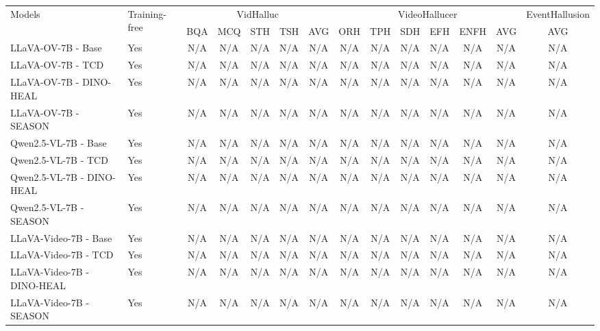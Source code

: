 \begin{tabular}{llccccc|cccccc|c}
\toprule
\multirow{2}{*}{Models} & \multirow{2}{*}{Training-free} & \multicolumn{5}{c|}{VidHalluc} & \multicolumn{6}{c|}{VideoHallucer} & EventHallusion \\
 & & BQA & MCQ & STH & TSH & AVG & ORH & TPH & SDH & EFH & ENFH & AVG & AVG \\
\midrule
LLaVA-OV-7B - Base & Yes & N/A & N/A & N/A & N/A & N/A & N/A & N/A & N/A & N/A & N/A & N/A & N/A \\
LLaVA-OV-7B - TCD & Yes & N/A & N/A & N/A & N/A & N/A & N/A & N/A & N/A & N/A & N/A & N/A & N/A \\
LLaVA-OV-7B - DINO-HEAL & Yes & N/A & N/A & N/A & N/A & N/A & N/A & N/A & N/A & N/A & N/A & N/A & N/A \\
LLaVA-OV-7B - SEASON & Yes & N/A & N/A & N/A & N/A & N/A & N/A & N/A & N/A & N/A & N/A & N/A & N/A \\
Qwen2.5-VL-7B - Base & Yes & N/A & N/A & N/A & N/A & N/A & N/A & N/A & N/A & N/A & N/A & N/A & N/A \\
Qwen2.5-VL-7B - TCD & Yes & N/A & N/A & N/A & N/A & N/A & N/A & N/A & N/A & N/A & N/A & N/A & N/A \\
Qwen2.5-VL-7B - DINO-HEAL & Yes & N/A & N/A & N/A & N/A & N/A & N/A & N/A & N/A & N/A & N/A & N/A & N/A \\
Qwen2.5-VL-7B - SEASON & Yes & N/A & N/A & N/A & N/A & N/A & N/A & N/A & N/A & N/A & N/A & N/A & N/A \\
LLaVA-Video-7B - Base & Yes & N/A & N/A & N/A & N/A & N/A & N/A & N/A & N/A & N/A & N/A & N/A & N/A \\
LLaVA-Video-7B - TCD & Yes & N/A & N/A & N/A & N/A & N/A & N/A & N/A & N/A & N/A & N/A & N/A & N/A \\
LLaVA-Video-7B - DINO-HEAL & Yes & N/A & N/A & N/A & N/A & N/A & N/A & N/A & N/A & N/A & N/A & N/A & N/A \\
LLaVA-Video-7B - SEASON & Yes & N/A & N/A & N/A & N/A & N/A & N/A & N/A & N/A & N/A & N/A & N/A & N/A \\
\bottomrule
\end{tabular}
